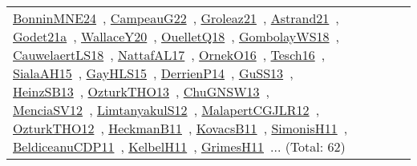 {\begin{longtable}{lp{3cm}>{\raggedright\arraybackslash}p{6cm}>{\raggedright\arraybackslash}p{6cm}>{\raggedright\arraybackslash}p{8cm}}
\href{../works/BonninMNE24.pdf}{BonninMNE24}~\cite{BonninMNE24}, \href{../works/CampeauG22.pdf}{CampeauG22}~\cite{CampeauG22}, \href{../works/Groleaz21.pdf}{Groleaz21}~\cite{Groleaz21}, \href{../works/Astrand21.pdf}{Astrand21}~\cite{Astrand21}, \href{../works/Godet21a.pdf}{Godet21a}~\cite{Godet21a}, \href{../works/WallaceY20.pdf}{WallaceY20}~\cite{WallaceY20}, \href{../works/OuelletQ18.pdf}{OuelletQ18}~\cite{OuelletQ18}, \href{../works/GombolayWS18.pdf}{GombolayWS18}~\cite{GombolayWS18}, \href{../works/CauwelaertLS18.pdf}{CauwelaertLS18}~\cite{CauwelaertLS18}, \href{../works/NattafAL17.pdf}{NattafAL17}~\cite{NattafAL17}, \href{../works/OrnekO16.pdf}{OrnekO16}~\cite{OrnekO16}, \href{../works/Tesch16.pdf}{Tesch16}~\cite{Tesch16}, \href{../works/SialaAH15.pdf}{SialaAH15}~\cite{SialaAH15}, \href{../works/GayHLS15.pdf}{GayHLS15}~\cite{GayHLS15}, \href{../works/DerrienP14.pdf}{DerrienP14}~\cite{DerrienP14}, \href{../works/GuSS13.pdf}{GuSS13}~\cite{GuSS13}, \href{../works/HeinzSB13.pdf}{HeinzSB13}~\cite{HeinzSB13}, \href{../works/OzturkTHO13.pdf}{OzturkTHO13}~\cite{OzturkTHO13}, \href{../works/ChuGNSW13.pdf}{ChuGNSW13}~\cite{ChuGNSW13}, \href{../works/MenciaSV12.pdf}{MenciaSV12}~\cite{MenciaSV12}, \href{../works/LimtanyakulS12.pdf}{LimtanyakulS12}~\cite{LimtanyakulS12}, \href{../works/MalapertCGJLR12.pdf}{MalapertCGJLR12}~\cite{MalapertCGJLR12}, \href{../works/OzturkTHO12.pdf}{OzturkTHO12}~\cite{OzturkTHO12}, \href{../works/HeckmanB11.pdf}{HeckmanB11}~\cite{HeckmanB11}, \href{../works/KovacsB11.pdf}{KovacsB11}~\cite{KovacsB11}, \href{../works/SimonisH11.pdf}{SimonisH11}~\cite{SimonisH11}, \href{../works/BeldiceanuCDP11.pdf}{BeldiceanuCDP11}~\cite{BeldiceanuCDP11}, \href{../works/KelbelH11.pdf}{KelbelH11}~\cite{KelbelH11}, \href{../works/GrimesH11.pdf}{GrimesH11}~\cite{GrimesH11}... (Total: 62)\\

\end{longtable}}
